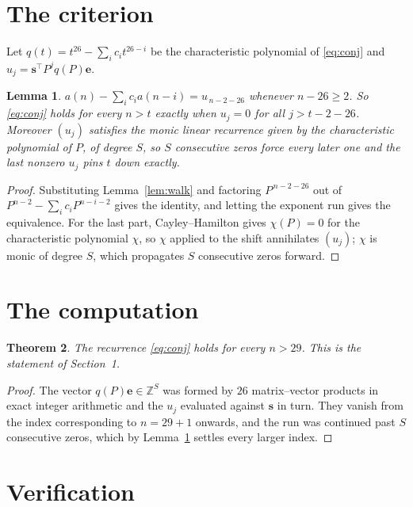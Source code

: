 \documentclass[11pt,a4paper]{article}
\theoremstyle{plain}
\newtheorem{theorem}{Theorem}
\newtheorem{lemma}[theorem]{Lemma}
\theoremstyle{definition}
\begin{document}
\section{The criterion}

Let $q(t)=t^{26}-\sum_i c_i t^{26-i}$ be the characteristic polynomial of
\eqref{eq:conj} and $u_j=\mathbf{s}^{\!\top}P^{j}q(P)\mathbf{e}$.

\begin{lemma}\label{lem:crit}
$a(n)-\sum_i c_i a(n-i)=u_{\,n-2-26}$ whenever $n-26\ge2$. So \eqref{eq:conj}
holds for every $n>t$ exactly when $u_j=0$ for all $j>t-2-26$. Moreover $(u_j)$
satisfies the monic linear recurrence given by the characteristic polynomial of $P$, of
degree $S$, so $S$ consecutive zeros force every later one and the last nonzero $u_j$ pins
$t$ down exactly.
\end{lemma}

\begin{proof}
Substituting Lemma~\ref{lem:walk} and factoring $P^{\,n-2-26}$ out of
$P^{n-2}-\sum_i c_i P^{n-i-2}$ gives the identity, and letting the exponent run gives the
equivalence. For the last part, Cayley--Hamilton gives $\chi(P)=0$ for the characteristic
polynomial $\chi$, so $\chi$ applied to the shift annihilates $(u_j)$; $\chi$ is monic of
degree $S$, which propagates $S$ consecutive zeros forward.
\end{proof}

\section{The computation}

\begin{theorem}
The recurrence \eqref{eq:conj} holds for every $n>29$. This is the statement of
Section~1.
\end{theorem}

\begin{proof}
The vector $q(P)\mathbf{e}\in\mathbb{Z}^{S}$ was formed by $26$ matrix--vector
products in exact integer arithmetic and the $u_j$ evaluated against $\mathbf{s}$ in turn.
They vanish from the index corresponding to $n=29+1$ onwards, and the run was continued
past $S$ consecutive zeros, which by Lemma~\ref{lem:crit} settles every larger index.
\end{proof}

\section{Verification}
\end{document}
